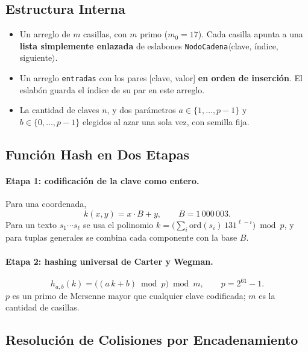 \documentclass[11pt,a4paper]{article}
\theoremstyle{definition}
\begin{document}
\subsection{Estructura Interna}
\begin{itemize}[leftmargin=*]
\item Un arreglo de $m$ casillas, con $m$ primo ($m_0=17$). Cada casilla apunta a una \textbf{lista simplemente enlazada} de eslabones \texttt{NodoCadena}$\langle$clave, índice, siguiente$\rangle$.
\item Un arreglo \texttt{{}entradas} con los pares [clave, valor] \textbf{en orden de inserción}. El eslabón guarda el índice de su par en este arreglo.
\item La cantidad de claves $n$, y dos parámetros $a\in\{1,\dots,p-1\}$ y $b\in\{0,\dots,p-1\}$ elegidos al azar una sola vez, con semilla fija.
\end{itemize}

\subsection{Función Hash en Dos Etapas}

\paragraph{Etapa 1: codificación de la clave como entero.} Para una coordenada,
\begin{equation}\label{eq:prehash}
k(x,y)=x\cdot B+y,\qquad B=1\,000\,003 .
\end{equation}
Para un texto $s_1\cdots s_\ell$ se usa el polinomio $k=\bigl(\sum_i \mathrm{ord}(s_i)\,131^{\ell-i}\bigr)\bmod p$, y para tuplas generales se combina cada componente con la base $B$.

\paragraph{Etapa 2: hashing universal de Carter y Wegman.}
\begin{equation}\label{eq:universal}
h_{a,b}(k)=\bigl((a\,k+b)\bmod p\bigr)\bmod m,\qquad p=2^{61}-1 .
\end{equation}
$p$ es un primo de Mersenne mayor que cualquier clave codificada; $m$ es la cantidad de casillas.

\subsection{Resolución de Colisiones por Encadenamiento}
\end{document}
